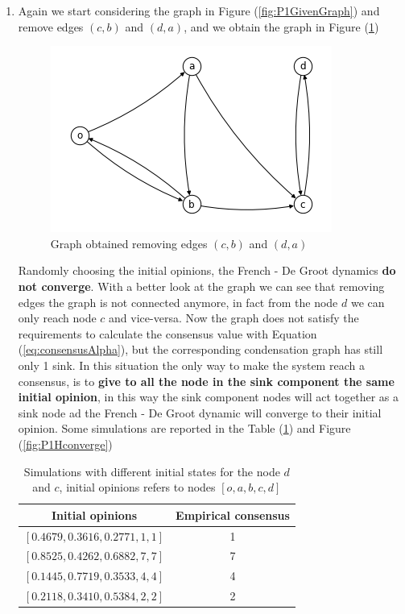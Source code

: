 \documentclass[
	12pt, %
]{fphw}
\begin{document}
\begin{enumerate}[(a\normalfont)]
    \item Again we start considering the graph in Figure (\ref{fig:P1GivenGraph}) and remove edges $(c,b)$ and $(d,a)$, and we obtain the graph in Figure (\ref{fig:P1H})
    
    \begin{figure}[H]
        \centering
    	\includegraphics[width=0.3\columnwidth]{P1H.png} 
    	\caption{Graph obtained removing edges $(c,b)$ and $(d,a)$}
    	\label{fig:P1H}
    \end{figure}
    
    Randomly choosing the initial opinions, the French - De Groot dynamics \textbf{do not converge}. With a better look at the graph we can see that removing edges the graph is not connected anymore, in fact from the node $d$ we can only reach node $c$ and vice-versa. 
    Now the graph does not satisfy the requirements to calculate the consensus value with Equation (\ref{eq:consensusAlpha}), but the corresponding condensation graph has still only 1 sink. In this situation the only way to make the system reach a consensus, is to \textbf{give to all the node in the sink component the same initial opinion}, in this way the sink component nodes will act together as a sink node ad the French - De Groot dynamic will converge to their initial opinion. 
    Some simulations are reported in the Table (\ref{tab:P1ConsensusH}) and Figure (\ref{fig:P1Hconverge})
    
    \begin{table}[H]
      \begin{center}
        \begin{tabular}{c|c} 
          \textbf{Initial opinions} & \textbf{Empirical consensus} \\
          \hline
          $[0.4679, 0.3616, 0.2771, 1, 1]$ & 1\\
          $[0.8525, 0.4262, 0.6882, 7, 7]$ & 7\\
          $[0.1445, 0.7719, 0.3533, 4, 4]$ & 4\\
          $[0.2118, 0.3410, 0.5384, 2, 2]$ & 2
        \end{tabular}
      \end{center}
      \caption{Simulations with different initial states for the node $d$ and $c$, initial opinions refers to nodes $[o, a, b, c, d]$}
      \label{tab:P1ConsensusH}
    \end{table}
    

\end{enumerate}
\end{document}

